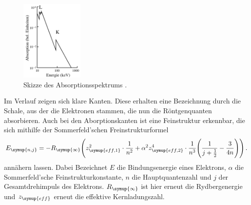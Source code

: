 \begin{figure}
  \centering
  \includegraphics[height=4cm]{data/absorption.png}
  \caption{Skizze des Absorptionsspektrums \cite{Versuchsanleitung}.}
  \label{fig:absorption}
\end{figure}

Im Verlauf zeigen sich klare Kanten. Diese erhalten eine Bezeichnung durch die
Schale, aus der die Elektronen stammen, die nun die Röntgenquanten absorbieren.
Auch bei den Aborptionskanten ist eine Feinstruktur erkennbar, die sich mithilfe
der Sommerfeld'schen Freinstrukturformel
\begin{equation}
  E_{\symup{n,j}}=-R_{\symup{\infty}}\Biggl(z_{\symup{eff,1}}^2\cdot \frac{1}{n^2} +
   \alpha^2 z_{\symup{eff,2}}^4\cdot \frac{1}{n^3}\Biggl(\frac{1}{j+\frac{1}{2}} -
   \frac{3}{4n}\Biggr)\Biggr) \,.
   \label{eqn:sommerfeld}
\end{equation}
annähern lassen. Dabei Bezeichnet $E$ die Bindungsenergie eines Elektrons, $\alpha$ die Sommerfeld'sche
Feinstrukturkonstante, $n$ die Hauptquantenzahl und $j$ der Gesamtdrehimpuls des
Elektrons. $R_{\symup{\infty}}$ ist hier erneut die Rydbergenergie und $z_{\symup{eff}}$ erneut
die effektive Kernladungszahl.

